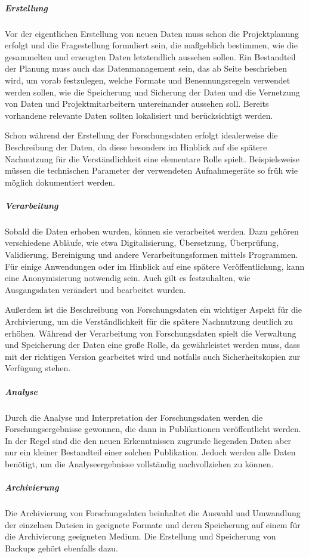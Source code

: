 \subparagraph{Erstellung} Vor der eigentlichen Erstellung von neuen Daten muss schon die Projektplanung erfolgt und die Fragestellung formuliert sein, die maßgeblich bestimmen, wie die gesammelten und erzeugten Daten letztendlich aussehen sollen. Ein Bestandteil der Planung muss auch das Datenmanagement sein, das ab Seite \pageref{datenmanagement} beschrieben wird, um vorab festzulegen, welche Formate und Benennungsregeln verwendet werden sollen, wie die Speicherung und Sicherung der Daten und die Vernetzung von Daten und Projektmitarbeitern untereinander aussehen soll. Bereits vorhandene relevante Daten sollten lokalisiert und berücksichtigt werden. 

Schon während der Erstellung der Forschungsdaten erfolgt idealerweise die Beschreibung der Daten, da diese besonders im Hinblick auf die spätere Nachnutzung für die Verständlichkeit eine elementare Rolle spielt. Beispielsweise müssen die technischen Parameter der verwendeten Aufnahmegeräte so früh wie möglich dokumentiert werden.

\subparagraph{Verarbeitung} Sobald die Daten erhoben wurden, können sie verarbeitet werden. Dazu gehören verschiedene Abläufe, wie etwa Digitalisierung, Übersetzung, Überprüfung, Validierung, Bereinigung und andere Verarbeitungsformen mittels Programmen. Für einige Anwendungen oder im Hinblick auf eine spätere Veröffentlichung, kann eine Anonymisierung notwendig sein. Auch gilt es festzuhalten, wie Ausgangsdaten verändert und bearbeitet wurden. 

Außerdem ist die Beschreibung von Forschungsdaten ein wichtiger Aspekt für die Archivierung, um die Verständlichkeit für die spätere Nachnutzung deutlich zu erhöhen. Während der Verarbeitung von Forschungsdaten spielt die Verwaltung und Speicherung der Daten eine große Rolle, da gewährleistet werden muss, dass mit der richtigen Version gearbeitet wird und notfalls auch Sicherheitskopien zur Verfügung stehen.

\subparagraph{Analyse} Durch die Analyse und Interpretation der Forschungsdaten werden die Forschungsergebnisse gewonnen, die dann in Publikationen veröffentlicht werden. In der Regel sind die den neuen Erkenntnissen zugrunde liegenden Daten aber nur ein kleiner Bestandteil einer solchen Publikation. Jedoch werden alle Daten benötigt, um die Analyseergebnisse vollständig nachvollziehen zu können.

\subparagraph{Archivierung} Die Archivierung von Forschungsdaten beinhaltet die Auswahl und Umwandlung der einzelnen Dateien in geeignete Formate und deren Speicherung auf einem für die Archivierung geeigneten Medium. Die Erstellung und Speicherung von Backups gehört ebenfalls dazu.

